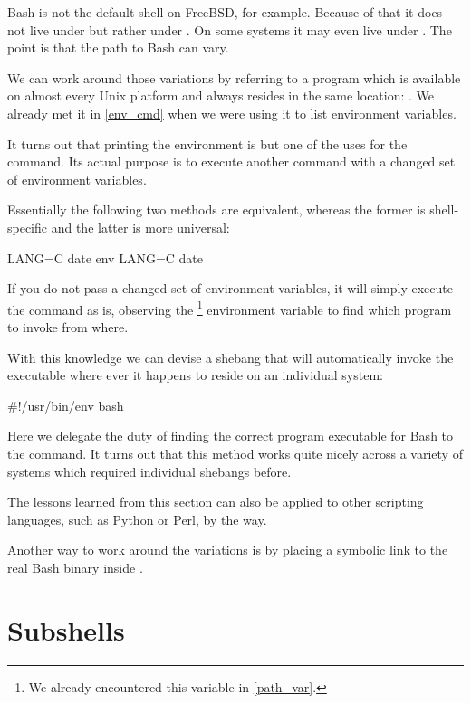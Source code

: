 \documentclass{olli-handout}
\begin{document}
Bash is not the default shell on FreeBSD, for example. Because of that it does not live under  but rather under . On some systems it may even live under . The point is that the path to Bash can vary.

We can work around those variations by referring to a program which is available on almost every Unix platform and always resides in the same location: . We already met it in \vref{env_cmd} when we were using it to list environment variables.

It turns out that printing the environment is but one of the uses for the command. Its actual purpose is to execute another command with a changed set of environment variables.

Essentially the following two methods are equivalent, whereas the former is shell-specific and the latter is more universal:

\begin{lstbash}
LANG=C date
env LANG=C date
\end{lstbash}

If you do not pass a changed set of environment variables, it will simply execute the command as is, observing the \footnote{We already encountered this variable in \vref{path_var}.} environment variable to find which program to invoke from where.

With this knowledge we can devise a shebang that will automatically invoke the  executable where ever it happens to reside on an individual system:

\begin{lstbash}
#!/usr/bin/env bash
\end{lstbash}

Here we delegate the duty of finding the correct program executable for Bash to the  command. It turns out that this method works quite nicely across a variety of systems which required individual shebangs before.

\begin{hintbox}
    {\olliPenR} The lessons learned from this section can also be applied to other scripting languages, such as Python or Perl, by the way.

    Another way to work around the variations is by placing a symbolic link to the real Bash binary inside .
\end{hintbox}

\section{Subshells}
\end{document}
